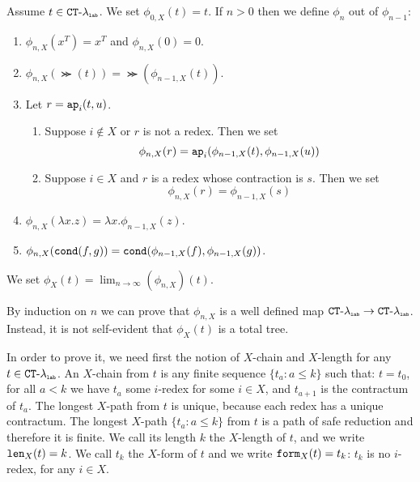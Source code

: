 \begin{definition}
Assume $t \in { { {\tt CT} \mbox{-} \lambda} _ {\mbox{\tiny \tt lab}} }$.
We set $\phi_{0,X}(t)=t$. If $n >0$ then we define $\phi_n$ out of $\phi_{n-1}$:
\begin{enumerate} 

\item
$\phi_{n,X}(x^T)=x^T$ and $\phi_{n,X}(0)=0$.

\item
$\phi_{n,X}(\Succ(t)) = \Succ(\phi_{n-1,X}(t))$. 

\item
Let $r = {\tt ap}_i(t,u)$. 
\begin{enumerate} 
\item
Suppose $i \not \in X$ or $r$ is not a redex. Then we set
$$\phi_{n,X}(r) = {\tt ap}_i(\phi_{n-1,X}(t),\phi_{n-1,X}(u))$$
\item
Suppose $i \in X$ and $r$ is a redex whose contraction is $s$. Then we set
$$\phi_{n,X}(r) = \phi_{n-1,X}(s)$$
\end{enumerate}

\item
$\phi_{n,X}(\lambda x.z) = \lambda x.\phi_{n-1,X}(z)$.

\item
$\phi_{n,X}({\tt cond}(f,g)) = {\tt cond}(\phi_{n-1,X}(f), \phi_{n-1,X}(g))$.

\end{enumerate}

We set $\phi_X(t) = \lim_{n \rightarrow \infty}(\phi_{n,X})(t)$.
\end{definition}


By induction on $n$ we can prove that 
$\phi_{n,X}$ is a well defined map ${{ {\tt CT} \mbox{-} \lambda}_{\mbox{\tiny \tt lab}}} \rightarrow { { {\tt CT} \mbox{-} \lambda} _ {\mbox{\tiny \tt lab}} }$.
Instead, it is not self-evident that $\phi_X(t)$ is a total tree.

In order to prove it, we need first the notion of $X$-chain and $X$-length for any $t \in { { {\tt CT} \mbox{-} \lambda} _ {\mbox{\tiny \tt lab}} }$.
An $X$-chain from $t$ is any finite sequence $\{t_a : a \le k\}$ such that: 
$t=t_0$, for all $a<k$ we have $t_a$ some $i$-redex for some $ i \in X$, and $t_{a+1}$ is the contractum
of $t_a$. The longest $X$-path from $t$ is unique, because each redex has a unique contractum. 
The longest $X$-path $\{t_a : a \le k\}$ 
from $t$ is a path of safe reduction and therefore it is finite. We call its length $k$ the
$X$-length of $t$, and we write ${\tt len}_X(t) = k$. We call $t_k$ the $X$-form of $t$ and we
write ${\tt form}_X(t) = t_k$: $t_k$ is no $i$-redex, for any $i \in X$.


